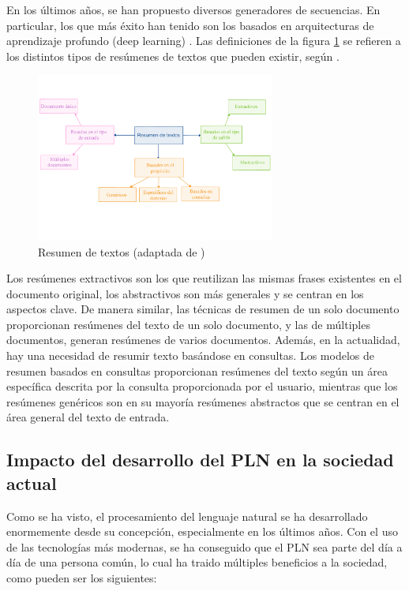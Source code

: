 En los últimos años, se han propuesto diversos generadores de secuencias. En particular, los que más éxito han tenido son los basados en arquitecturas de aprendizaje profundo (deep learning) \citep{mishra2020deep}. Las definiciones de la figura \ref{fig:resumenTextos} se refieren a los distintos tipos de resúmenes de textos que pueden existir, según \cite{adhikari2020nlp}. 

\begin{figure}[h]
	\centering
	\includegraphics[width = 0.7\textwidth]{Imagenes/Vectorial/resumenTextos.pdf}
	\caption{Resumen de textos (adaptada de \cite{adhikari2020nlp})}
	\label{fig:resumenTextos}
\end{figure}

Los resúmenes extractivos son los que reutilizan las mismas frases existentes en el documento original, los abstractivos son más generales y se centran en los aspectos clave. De manera similar, las técnicas de resumen de un solo documento proporcionan resúmenes del texto de un solo documento, y las de múltiples documentos, generan resúmenes de varios documentos. Además, en la actualidad, hay una necesidad de resumir texto basándose en consultas. Los modelos de resumen basados en consultas proporcionan resúmenes del texto según un área específica descrita por la consulta proporcionada por el usuario, mientras que los resúmenes genéricos son en su mayoría resúmenes abstractos que se centran en el área general del texto de entrada.

\subsection{Impacto del desarrollo del PLN en la sociedad actual}

Como se ha visto, el procesamiento del lenguaje natural se ha desarrollado enormemente desde su concepción, especialmente en los últimos años. Con el uso de las tecnologías más modernas, se ha conseguido que el PLN sea parte del día a día de una persona común, lo cual ha traido múltiples beneficios a la sociedad, como pueden ser los siguientes:

